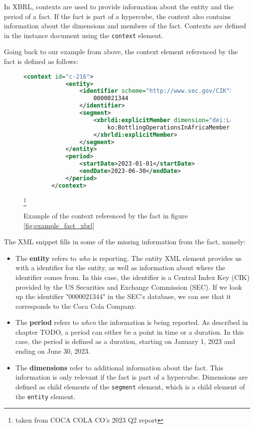 In XBRL, contexts are used to provide information about the entity and the period of a fact. 
If the fact is part of a hypercube, the context also contains information about the dimensions and members of the fact.
Contexts are defined in the instance document using the \texttt{context} element.

Going back to our example from above, the context element referenced by the fact is defined as follows:

\begin{figure}[H]
    \caption{Example of the context referenced by the fact in figure \ref{fig:example_fact_xbrl}}
    \label{fig:example_context_xbrl}
    \begin{lstlisting}[language=XML]
        <context id="c-216">
            <entity>
                <identifier scheme="http://www.sec.gov/CIK">
                    0000021344
                </identifier>
                <segment>
                    <xbrldi:explicitMember dimension="dei:LegalEntityAxis">
                        ko:BottlingOperationsInAfricaMember
                    </xbrldi:explicitMember>
                </segment>
            </entity>
            <period>
                <startDate>2023-01-01</startDate>
                <endDate>2023-06-30</endDate>
            </period>
        </context>
    \end{lstlisting}
    \footnote{taken from COCA COLA CO's 2023 Q2 report}
\end{figure}

The XML snippet fills in some of the missing information from the fact, namely:

\begin{itemize}
    \item The \textbf{entity} refers to \textit{who} is reporting. 
    The entity XML element provides us with a identifier for the entity, as well as information about where the identifier comes from.
    In this case, the identifier is a Central Index Key (CIK) provided by the US Securities and Exchange Commission (SEC).
    If we look up the identifier "0000021344" in the SEC's database, we can see that it corresponds to the Coca Cola Company.
    \item The \textbf{period} refers to \textit{when} the information is being reported.
    As described in chapter TODO, a period can either be a point in time or a duration.
    In this case, the period is defined as a duration, starting on January 1, 2023 and ending on June 30, 2023.
    \item The \textbf{dimensions} refer to additional information about the fact.
    This information is only relevant if the fact is part of a hypercube.
    Dimensions are defined as child elements of the \texttt{segment} element, 
    which is a child element of the \texttt{entity} element.
\end{itemize}

